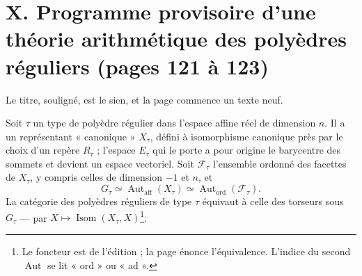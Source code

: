 \documentclass[11pt,a4paper]{article}
\begin{document}
\section*{X. Programme provisoire d'une théorie arithmétique des polyèdres réguliers (pages 121 à 123)}

Le titre, souligné, est le sien, et la page commence un texte neuf.

Soit $\tau$ un type de polyèdre régulier dans l'espace affine réel de dimension
$n$. Il a un représentant « canonique » $X_\tau$, défini à isomorphisme
canonique près par le choix d'un repère $R_\tau$ ; l'espace $E_\tau$ qui le
porte a pour origine le barycentre des sommets et devient un espace vectoriel.
Soit $\mathcal{F}_\tau$ l'ensemble ordonné des facettes de $X_\tau$, y compris
celles de dimension $-1$ et $n$, et
\[
G_\tau \simeq \operatorname{Aut}_{\mathrm{aff}}(X_\tau) \simeq \operatorname{Aut}_{\mathrm{ord}}(\mathcal{F}_\tau) .
\]
La catégorie des polyèdres réguliers de type $\tau$ équivaut à celle des
torseurs sous $G_\tau$ --- par $X \mapsto \operatorname{Isom}(X_\tau, X)$\footnote{Le
foncteur est de l'édition ; la page énonce l'équivalence. L'indice du second
$\operatorname{Aut}$ se lit « ord » ou « ad ».}.
\end{document}
